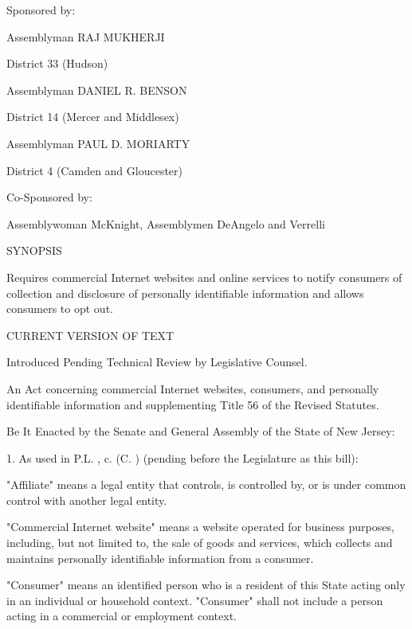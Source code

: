 Sponsored by:

Assemblyman  RAJ MUKHERJI

District 33 (Hudson)

Assemblyman  DANIEL R. BENSON

District 14 (Mercer and Middlesex)

Assemblyman  PAUL D. MORIARTY

District 4 (Camden and Gloucester)

 

Co-Sponsored by:

Assemblywoman McKnight, Assemblymen DeAngelo and Verrelli

 

 

 

 

SYNOPSIS

     Requires commercial Internet websites and online services to notify consumers of collection and disclosure of personally identifiable information and allows consumers to opt out.

 

CURRENT VERSION OF TEXT

     Introduced Pending Technical Review by Legislative Counsel.

  


An Act concerning commercial Internet websites, consumers, and personally identifiable information and supplementing Title 56 of the Revised Statutes.

 

     Be It Enacted by the Senate and General Assembly of the State of New Jersey:

 

      1.   As used in P.L.    , c.    (C.      ) (pending before the Legislature as this bill):

      "Affiliate" means a legal entity that controls, is controlled by, or is under common control with another legal entity.

     "Commercial Internet website" means a website operated for business purposes, including, but not limited to, the sale of goods and services, which collects and maintains personally identifiable information from a consumer.

     "Consumer" means an identified person who is a resident of this State acting only in an individual or household context. "Consumer" shall not include a person acting in a commercial or employment context.


